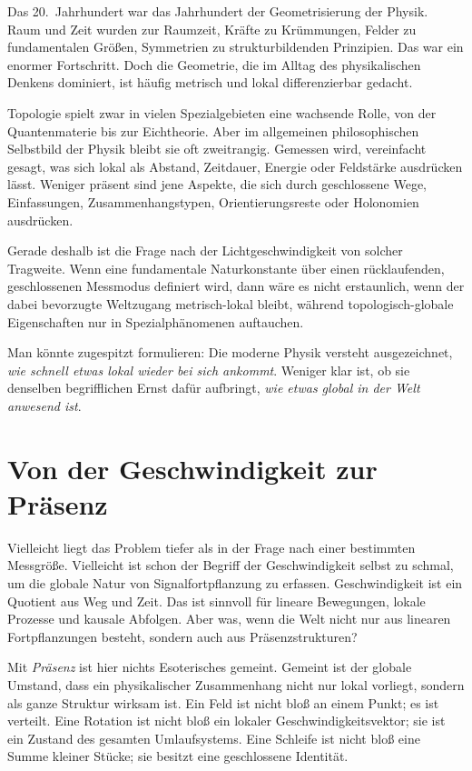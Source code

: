 \documentclass[11pt,a4paper]{article}
\theoremstyle{remark}
\begin{document}
	Das 20.\ Jahrhundert war das Jahrhundert der Geometrisierung der Physik. Raum und Zeit wurden zur Raumzeit, Kräfte zu Krümmungen, Felder zu fundamentalen Größen, Symmetrien zu strukturbildenden Prinzipien. Das war ein enormer Fortschritt. Doch die Geometrie, die im Alltag des physikalischen Denkens dominiert, ist häufig metrisch und lokal differenzierbar gedacht.
	
	Topologie spielt zwar in vielen Spezialgebieten eine wachsende Rolle, von der Quantenmaterie bis zur Eichtheorie. Aber im allgemeinen philosophischen Selbstbild der Physik bleibt sie oft zweitrangig. Gemessen wird, vereinfacht gesagt, was sich lokal als Abstand, Zeitdauer, Energie oder Feldstärke ausdrücken lässt. Weniger präsent sind jene Aspekte, die sich durch geschlossene Wege, Einfassungen, Zusammenhangstypen, Orientierungsreste oder Holonomien ausdrücken.
	
	Gerade deshalb ist die Frage nach der Lichtgeschwindigkeit von solcher Tragweite. Wenn eine fundamentale Naturkonstante über einen rücklaufenden, geschlossenen Messmodus definiert wird, dann wäre es nicht erstaunlich, wenn der dabei bevorzugte Weltzugang metrisch-lokal bleibt, während topologisch-globale Eigenschaften nur in Spezialphänomenen auftauchen.
	
	Man könnte zugespitzt formulieren: Die moderne Physik versteht ausgezeichnet, \emph{wie schnell etwas lokal wieder bei sich ankommt}. Weniger klar ist, ob sie denselben begrifflichen Ernst dafür aufbringt, \emph{wie etwas global in der Welt anwesend ist}.
	
	\section{Von der Geschwindigkeit zur Präsenz}
	
	Vielleicht liegt das Problem tiefer als in der Frage nach einer bestimmten Messgröße. Vielleicht ist schon der Begriff der Geschwindigkeit selbst zu schmal, um die globale Natur von Signalfortpflanzung zu erfassen. Geschwindigkeit ist ein Quotient aus Weg und Zeit. Das ist sinnvoll für lineare Bewegungen, lokale Prozesse und kausale Abfolgen. Aber was, wenn die Welt nicht nur aus linearen Fortpflanzungen besteht, sondern auch aus Präsenzstrukturen?
	
	Mit \emph{Präsenz} ist hier nichts Esoterisches gemeint. Gemeint ist der globale Umstand, dass ein physikalischer Zusammenhang nicht nur lokal vorliegt, sondern als ganze Struktur wirksam ist. Ein Feld ist nicht bloß an einem Punkt; es ist verteilt. Eine Rotation ist nicht bloß ein lokaler Geschwindigkeitsvektor; sie ist ein Zustand des gesamten Umlaufsystems. Eine Schleife ist nicht bloß eine Summe kleiner Stücke; sie besitzt eine geschlossene Identität.
	
\end{document}
